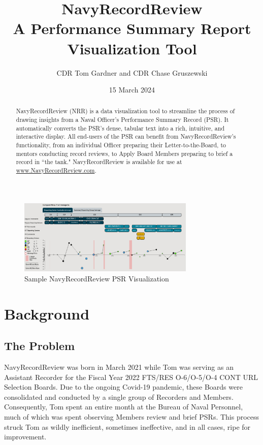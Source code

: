 \documentclass[UTF8]{article}
\begin{document}
\title{
  NavyRecordReview \\
  \large A Performance Summary Report Visualization Tool
}

\author{CDR Tom Gardner and CDR Chase Gruszewski}
\date{15 March 2024}
\maketitle


\begin{abstract}
NavyRecordReview (NRR) is a data visualization tool to streamline the process of
drawing insights from a Naval Officer's Performance Summary Record (PSR). It 
automatically converts the PSR's dense, tabular text into a rich, intuitive, 
and interactive display. All end-users of the PSR can benefit from 
NavyRecordReview's functionality, from an individual Officer preparing their
Letter-to-the-Board, to mentors conducting record reviews, to Apply Board Members 
preparing to brief a record in ``the tank." NavyRecordReview is available for 
use at \href{https://www.navyrecordreview.com}{www.NavyRecordReview.com}.
\end{abstract}

\begin{figure}[h!]
 \centering
 \includegraphics[width=0.75\textwidth]{nrr_dashboard.png}
 \caption{Sample NavyRecordReview PSR Visualization}
\end{figure}


\section{Background}
\subsection{The Problem}
NavyRecordReview was born in March 2021 while Tom was serving as an Assistant
Recorder for the Fiscal Year 2022 FTS/RES O-6/O-5/O-4 CONT URL Selection Boards.
Due to the ongoing Covid-19 pandemic, these Boards were consolidated and
conducted by a single group of Recorders and Members. Consequently, Tom spent an
entire month at the Bureau of Naval Personnel, much of which was spent
observing Members review and brief PSRs. This process struck Tom as wildly
inefficient, sometimes ineffective, and in all cases, ripe for improvement.\\
\end{document}
